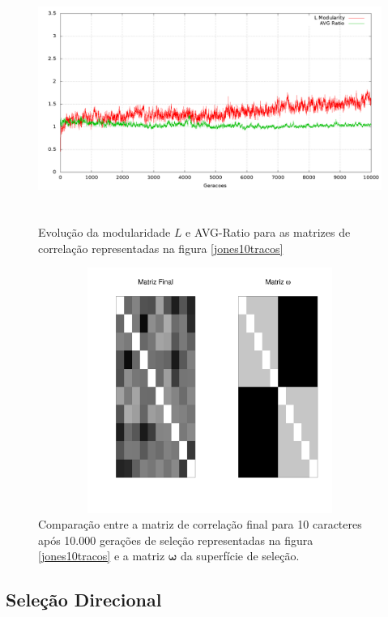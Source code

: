 \begin{figure}[htbp]
    \centering
    \includegraphics[width=150mm, height=80mm]{figuras/jones10tracosStats.png}
    \caption{Evolução da modularidade $L$ e AVG-Ratio para as matrizes de
    correlação representadas na figura \ref{jones10tracos}}
    \label{jones10tracosStats}
\end{figure}

\begin{figure}[htbp]
    \centering
    \includegraphics[width=150mm, height=80mm]{figuras/Mat10tracos}
    \caption{Comparação entre a matriz de correlação final para 10
        caracteres após 10.000 gerações de seleção representadas na figura
    \ref{jones10tracos} e a matriz $\pmb{\omega}$ da superfície de seleção.}
    \label{MatJones10tracos}
\end{figure}

\subsection{Seleção Direcional}

